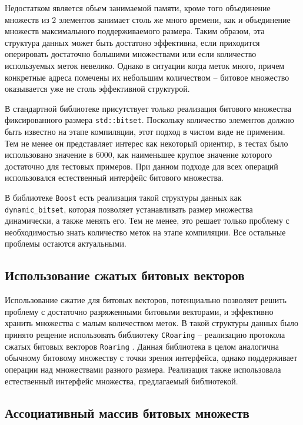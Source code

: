 Недостатком является обьем занимаемой памяти, кроме того объединение множеств из $2$ элементов занимает столь же много времени, как и объединение множеств максимального поддерживаемого размера. Таким образом, эта структура данных может быть достатоно эффективна, если приходится оперировать достаточно большими множествами или если количество используемых меток невелико. Однако в ситуации когда меток много, причем конкретные адреса помечены их небольшим количеством -- битовое множество оказывается уже не столь эффективной структурой.

В стандартной библиотеке присутствует только реализация битового множества фиксированного размера \texttt{std::bitset}. Поскольку количество элементов должно быть известно на этапе компиляции, этот подход в чистом виде не применим. Тем не менее он представляет интерес как некоторый ориентир, в тестах было использовано значение в $6000$, как наименьшее круглое значение которого достаточно для тестовых примеров.
При данном подходе для всех операций использовался естественный интерфейс битового множества.

В библиотеке \texttt{Boost} есть реализация такой структуры данных как \texttt{dynamic\_bitset}, которая позволяет устанавливать размер множества динамически, а также менять его. Тем не менее, это решает только проблему с необходимостью знать количество меток на этапе компиляции. Все остальные проблемы остаются актуальными.

\subsection{Использование сжатых битовых векторов}

Использование сжатие для битовых векторов, потенциально позволяет решить проблему с достаточно разряженными битовыми векторами, и эффективно хранить множества с малым количеством меток.
В такой структуры данных было принято рещение использовать библиотеку \texttt{CRoaring} -- реализацию протокола сжатых битовых векторов \texttt{Roaring} \cite{Roaring}. Данная библиотека в целом аналогична обычному битовому множеству с точки зрения интерфейса, однако поддерживает операции над множествами разного размера. Реализация также использовала естественный интерфейс множества, предлагаемый библиотекой.


\subsection{Ассоциативный массив битовых множеств}

